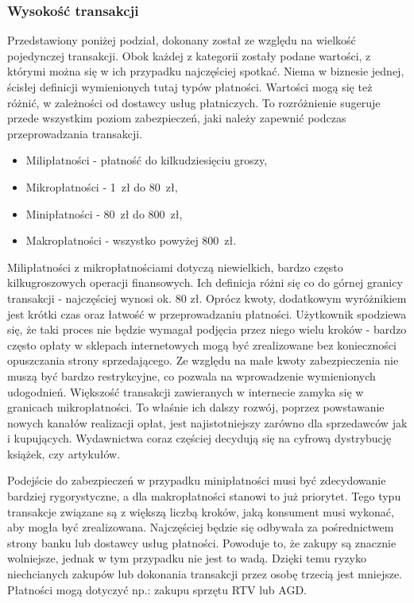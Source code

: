 \subsubsection*{Wysokość transakcji}
Przedstawiony poniżej podział, dokonany został ze względu na wielkość pojedynczej transakcji. Obok każdej z kategorii zostały podane wartości, z którymi można się w ich przypadku najczęściej spotkać. Niema w biznesie jednej, ścisłej definicji wymienionych tutaj typów płatności. Wartości mogą się też różnić, w zależności od dostawcy usług płatniczych. To rozróżnienie sugeruje przede wszystkim poziom zabezpieczeń, jaki należy zapewnić podczas przeprowadzania transakcji.
\begin{itemize}
	\item Milipłatności - płatność do kilkudziesięciu groszy,
	\item Mikropłatności - 1~zł do 80~zł,
	\item Minipłatności - 80~zł do 800~zł,
	\item Makropłatności - wszystko powyżej 800~zł. 
\end{itemize}
Milipłatności z mikropłatnościami dotyczą niewielkich, bardzo często kilkugroszowych operacji finansowych. Ich definicja różni się co do górnej granicy transakcji - najczęściej wynosi ok. 80 zł. Oprócz kwoty, dodatkowym wyróżnikiem jest krótki czas oraz łatwość w przeprowadzaniu płatności. Użytkownik spodziewa się, że taki proces nie będzie wymagał podjęcia przez niego wielu kroków - bardzo często opłaty w sklepach internetowych mogą być zrealizowane bez konieczności opuszczania strony sprzedającego. Ze względu na małe kwoty zabezpieczenia nie muszą być bardzo restrykcyjne, co pozwala na wprowadzenie wymienionych udogodnień. Większość transakcji zawieranych w internecie zamyka się w granicach mikropłatności. To właśnie ich dalszy rozwój, poprzez powstawanie nowych kanałów realizacji opłat, jest najistotniejszy zarówno dla sprzedawców jak i kupujących. Wydawnictwa coraz częściej decydują się na cyfrową dystrybucję książek, czy artykułów.

Podejście do zabezpieczeń w przypadku minipłatności musi być zdecydowanie bardziej rygorystyczne, a dla makropłatności stanowi to już priorytet. Tego typu transakcje związane są z większą liczbą kroków, jaką konsument musi wykonać, aby mogła być zrealizowana. Najczęściej będzie się odbywała za pośrednictwem strony banku lub dostawcy usług płatności. Powoduje to, że zakupy są znacznie wolniejsze, jednak w tym przypadku nie jest to wadą. Dzięki  temu ryzyko niechcianych zakupów lub dokonania transakcji przez osobę trzecią jest mniejsze. Płatności mogą dotyczyć np.: zakupu sprzętu RTV lub AGD.

